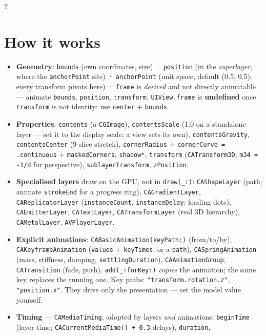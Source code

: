 \documentclass[8pt]{extarticle}
\newcommand\ct[1]{\texttt{#1}}
\begin{document}
\begin{multicols}{2}
\small\raggedright

\section{How it works}
\begin{itemize}
  \item \textbf{Geometry}: \ct{bounds} (own coordinates, size) · \ct{position} (in the
        \emph{superlayer}, where the \ct{anchorPoint} sits) · \ct{anchorPoint} (unit space,
        default (0.5, 0.5); every transform pivots here) · \ct{frame} is \emph{derived} and
        not directly animatable — animate \ct{bounds}, \ct{position}, \ct{transform}.
        \texttt{UIView.frame} is \textbf{undefined} once \ct{transform} is not identity: use
        \ct{center} + \ct{bounds}.
  \item \textbf{Properties}: \ct{contents} (a \ct{CGImage}), \ct{contentsScale}
        (1.0 on a standalone layer — set it to the display scale; a view sets its own),
        \ct{contentsGravity}, \ct{contentsCenter} (9-slice stretch), \ct{cornerRadius} +
        \ct{cornerCurve = .continuous} + \ct{maskedCorners}, \ct{shadow*},
        \ct{transform} (\ct{CATransform3D}; \ct{m34 = -1/d} for perspective),
        \ct{sublayerTransform}, \ct{zPosition}.
  \item \textbf{Specialised layers} draw on the GPU, not in \ct{draw(\_:)}:
        \ct{CAShapeLayer} (path; animate \ct{strokeEnd} for a progress ring),
        \ct{CAGradientLayer}, \ct{CAReplicatorLayer} (\ct{instanceCount},
        \ct{instanceDelay}: loading dots), \ct{CAEmitterLayer}, \ct{CATextLayer},
        \ct{CATransformLayer} (real 3D hierarchy), \ct{CAMetalLayer}, \ct{AVPlayerLayer}.
  \item \textbf{Explicit animations}: \ct{CABasicAnimation(keyPath:)}
        (from/to/by), \ct{CAKeyframeAnimation} (\ct{values} + \ct{keyTimes}, or a
        \ct{path}), \ct{CASpringAnimation} (mass, stiffness, damping,
        \ct{settlingDuration}), \ct{CAAnimationGroup}, \ct{CATransition} (fade, push).
        \ct{add(\_:forKey:)} \emph{copies} the animation; the same key replaces the running
        one. Key paths: \ct{"transform.rotation.z"}, \ct{"position.x"}. They drive only the
        presentation — set the model value yourself.
  \item \textbf{Timing} — \ct{CAMediaTiming}, adopted by layers \emph{and} animations:
        \ct{beginTime} (layer time; \ct{CACurrentMediaTime() + 0.3} delays), \ct{duration},

\end{itemize}
\end{multicols}
\end{document}
